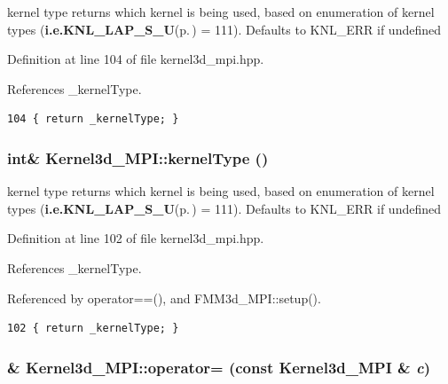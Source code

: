 kernel type returns which kernel is being used, based on enumeration of kernel types ({\bf i.e.KNL\_\-LAP\_\-S\_\-U}{\rm (p.\,\pageref{kernel3d__mpi_8hpp_dca29a1140aadadfd92b34a02fa516ef_dca29a1140aadadfd92b34a02fa516ef8303e879d2d1daf3b5539bb5684e3df8})} = 111). Defaults to KNL\_\-ERR if undefined 

Definition at line 104 of file kernel3d\_\-mpi.hpp.

References \_\-kernel\-Type.

\footnotesize\begin{verbatim}104 { return _kernelType; }
\end{verbatim}\normalsize 


\subsubsection{\setlength{\rightskip}{0pt plus 5cm}int\& Kernel3d\_\-MPI::kernel\-Type ()\hspace{0.3cm}{\tt  [inline]}}\label{classKernel3d__MPI_dafce73fc921ab6ff4e38f86e70c2c0c_dafce73fc921ab6ff4e38f86e70c2c0c}


kernel type returns which kernel is being used, based on enumeration of kernel types ({\bf i.e.KNL\_\-LAP\_\-S\_\-U}{\rm (p.\,\pageref{kernel3d__mpi_8hpp_dca29a1140aadadfd92b34a02fa516ef_dca29a1140aadadfd92b34a02fa516ef8303e879d2d1daf3b5539bb5684e3df8})} = 111). Defaults to KNL\_\-ERR if undefined 

Definition at line 102 of file kernel3d\_\-mpi.hpp.

References \_\-kernel\-Type.

Referenced by operator==(), and FMM3d\_\-MPI::setup().

\footnotesize\begin{verbatim}102 { return _kernelType; }
\end{verbatim}\normalsize 


\subsubsection{\& Kernel3d\_\-MPI::operator= (const {\bf Kernel3d\_\-MPI} \& {\em c})\hspace{0.3cm}{\tt  [inline]}}\label{classKernel3d__MPI_707715fb796bd5714a49dce6a806a46d_707715fb796bd5714a49dce6a806a46d}


